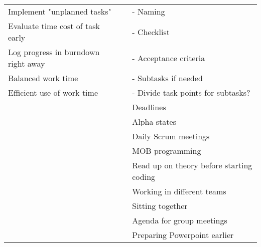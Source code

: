 \begin{table}[htbp]
{\begin{tabular}{lll}
Implement "unplanned tasks"         &                                    & - Naming                                         \\
Evaluate time cost of task early    &                                    & - Checklist                                      \\
Log progress in burndown right away &                                    & - Acceptance criteria                            \\
Balanced work time                  &                                    & - Subtasks if needed                             \\
Efficient use of work time          &                                    & - Divide task points for subtasks?               \\
                                    &                                    & Deadlines                                        \\
                                    &                                    & Alpha states                                     \\
                                    &                                    & Daily Scrum meetings                             \\
                                    &                                    & MOB programming                                  \\
                                    &                                    & Read up on theory before starting coding         \\
                                    &                                    & Working in different teams                       \\
                                    &                                    & Sitting together                                 \\
                                    &                                    & Agenda for group meetings                        \\
                                    &                                    & Preparing Powerpoint earlier                    \\ \hline
\end{tabular}%
}
\end{table}
